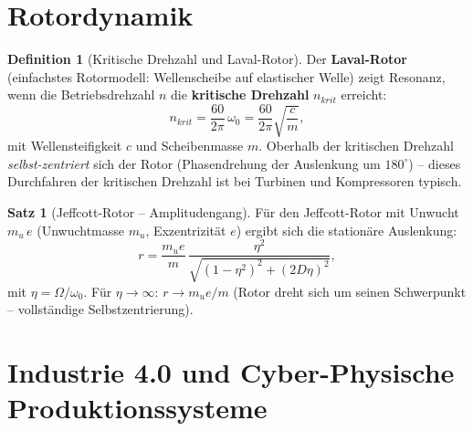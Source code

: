 ﻿\documentclass[a4paper,12pt]{report}
\theoremstyle{definition}
\newtheorem{definition}{Definition}
\newtheorem{satz}{Satz}
\begin{document}
\section{Rotordynamik}

\begin{definition}[Kritische Drehzahl und Laval-Rotor]
Der \textbf{Laval-Rotor} (einfachstes Rotormodell: Wellenscheibe auf
elastischer Welle) zeigt Resonanz, wenn die Betriebsdrehzahl $n$ die
\textbf{kritische Drehzahl} $n_{krit}$ erreicht:
\[
  n_{krit} = \frac{60}{2\pi}\,\omega_0 = \frac{60}{2\pi}\sqrt{\frac{c}{m}},
\]
mit Wellensteifigkeit $c$ und Scheibenmasse $m$.
Oberhalb der kritischen Drehzahl \emph{selbst-zentriert} sich der Rotor
(Phasendrehung der Auslenkung um $180^\circ$) -- dieses Durchfahren
der kritischen Drehzahl ist bei Turbinen und Kompressoren typisch.
\end{definition}

\begin{satz}[Jeffcott-Rotor -- Amplitudengang]
Für den Jeffcott-Rotor mit Unwucht $m_u\,e$ (Unwuchtmasse $m_u$,
Exzentrizität $e$) ergibt sich die stationäre Auslenkung:
\[
  r = \frac{m_u e}{m}\,\frac{\eta^2}{\sqrt{(1-\eta^2)^2+(2D\eta)^2}},
\]
mit $\eta = \Omega/\omega_0$. Für $\eta \to \infty$: $r \to m_u e / m$
(Rotor dreht sich um seinen Schwerpunkt -- vollständige Selbstzentrierung).
\end{satz}



\section{Industrie 4.0 und Cyber-Physische Produktionssysteme}
\end{document}
